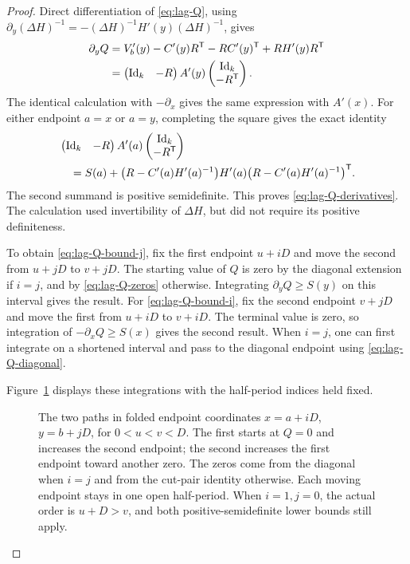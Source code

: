 \begin{proof}
Direct differentiation of \eqref{eq:lag-Q}, using
$\partial_y(\Delta H)^{-1}=-(\Delta H)^{-1}H'(y)(\Delta H)^{-1}$,
gives
\begin{align*}
 \partial_yQ
 &=V_b'(y)-C'(y)R^{\mathsf T}-R C'(y)^{\mathsf T}
                  +R H'(y)R^{\mathsf T}\\
 &=\begin{pmatrix}\mathrm{Id}_k&-R\end{pmatrix}A'(y)
                  \begin{pmatrix}\mathrm{Id}_k\\-R^{\mathsf T}\end{pmatrix}.
\end{align*}
The identical calculation with $-\partial_x$ gives the same expression
with $A'(x)$.  For either endpoint $a=x$ or $a=y$, completing the
square gives the exact identity
\begin{align}
 &\begin{pmatrix}\mathrm{Id}_k&-R\end{pmatrix}A'(a)
                  \begin{pmatrix}\mathrm{Id}_k\\-R^{\mathsf T}\end{pmatrix}
 \notag\\
 &\quad=S(a)+
 \bigl(R-C'(a)H'(a)^{-1}\bigr)H'(a)
 \bigl(R-C'(a)H'(a)^{-1}\bigr)^{\mathsf T}.
 \label{eq:lag-square-completion}
\end{align}
The second summand is positive semidefinite.  This proves
\eqref{eq:lag-Q-derivatives}.  The calculation used invertibility of
$\Delta H$, but did not require its positive definiteness.

To obtain \eqref{eq:lag-Q-bound-j}, fix the first endpoint $u+iD$ and
move the second from $u+jD$ to $v+jD$.  The starting value of $Q$ is
zero by the diagonal extension if $i=j$, and by
\eqref{eq:lag-Q-zeros} otherwise.  Integrating $\partial_yQ\ge S(y)$
on this interval gives the result.  For
\eqref{eq:lag-Q-bound-i}, fix the second endpoint $v+jD$ and move the
first from $u+iD$ to $v+iD$.  The terminal value is zero, so integration
of $-\partial_xQ\ge S(x)$ gives the second result.  When $i=j$, one
can first integrate on a shortened interval and pass to the diagonal
endpoint using \eqref{eq:lag-Q-diagonal}.

Figure~\ref{fig:schur-endpoint-paths} displays these integrations
with the half-period indices held fixed.
\begin{figure}[tbp]
\centering

\caption{The two paths in folded endpoint coordinates
$x=a+iD$, $y=b+jD$, for $0<u<v<D$.
The first starts at $Q=0$ and increases the second endpoint;
the second increases the first endpoint toward another zero.
The zeros come from the diagonal when $i=j$ and from the cut-pair
identity otherwise. Each moving endpoint stays in one open
half-period. When $i=1,j=0$, the actual order is $u+D>v$,
and both positive-semidefinite lower bounds still apply.}
\label{fig:schur-endpoint-paths}
\end{figure}


\end{proof}
